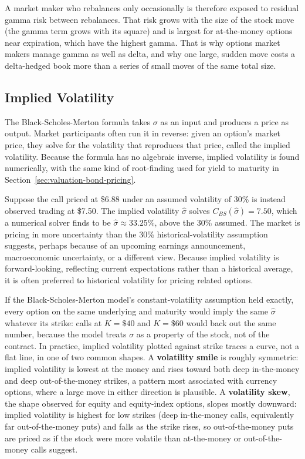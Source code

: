 \documentclass[../ai_in_finance]{subfiles}
\begin{document}
A market maker who rebalances only occasionally is therefore exposed to residual gamma risk between rebalances. That risk grows with the size of the stock move (the gamma term grows with its square) and is largest for at-the-money options near expiration, which have the highest gamma. That is why options market makers manage gamma as well as delta, and why one large, sudden move costs a delta-hedged book more than a series of small moves of the same total size.

\subsection{Implied Volatility}

The Black-Scholes-Merton formula takes $\sigma$ as an input and produces a price as output. Market participants often run it in reverse: given an option's market price, they solve for the volatility that reproduces that price, called the implied volatility. Because the formula has no algebraic inverse, implied volatility is found numerically, with the same kind of root-finding used for yield to maturity in Section~\ref{sec:valuation-bond-pricing}.

Suppose the call priced at \$6.88 under an assumed volatility of 30\% is instead observed trading at \$7.50.
The implied volatility $\hat\sigma$ solves $C_{BS}(\hat\sigma) = 7.50$, which a numerical solver finds to be $\hat\sigma \approx 33.25\%$, above the 30\% assumed.
The market is pricing in more uncertainty than the 30\% historical-volatility assumption suggests, perhaps because of an upcoming earnings announcement,
macroeconomic uncertainty, or a different view. Because implied volatility is forward-looking, reflecting current
expectations rather than a historical average, it is often preferred to historical volatility for pricing related options.

If the Black-Scholes-Merton model's constant-volatility assumption held exactly, every option on the same underlying and maturity
would imply the same $\hat\sigma$ whatever its strike: calls at $K=\$40$ and $K=\$60$ would back out the same number, because
the model treats $\sigma$ as a property of the stock, not of the contract. In practice, implied volatility plotted against strike
traces a curve, not a flat line, in one of two common shapes. A \textbf{volatility smile} is roughly symmetric: implied volatility is
lowest at the money and rises toward both deep in-the-money and deep out-of-the-money strikes, a pattern most associated with currency options,
where a large move in either direction is plausible. A \textbf{volatility skew}, the
shape observed for equity and equity-index options, slopes mostly downward: implied volatility is highest for low strikes
(deep in-the-money calls, equivalently far out-of-the-money puts) and falls as the strike rises, so out-of-the-money puts are
priced as if the stock were more volatile than at-the-money or out-of-the-money calls suggest.
\end{document}
